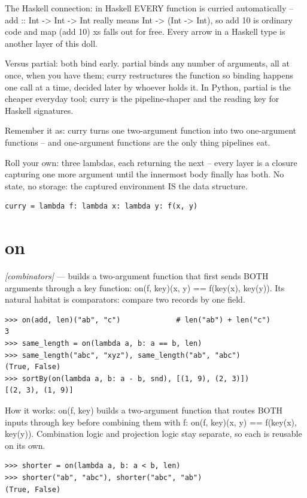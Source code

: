 \documentclass[11pt,letterpaper]{book}
\begin{document}
The Haskell connection: in Haskell EVERY function is curried automatically -- add :: Int -> Int -> Int really means Int -> (Int -> Int), so add 10 is ordinary code and map (add 10) xs falls out for free. Every arrow in a Haskell type is another layer of this doll.


Versus partial: both bind early. partial binds any number of arguments, all at once, when you have them; curry restructures the function so binding happens one call at a time, decided later by whoever holds it. In Python, partial is the cheaper everyday tool; curry is the pipeline-shaper and the reading key for Haskell signatures.


Remember it as: curry turns one two-argument function into two one-argument functions -- and one-argument functions are the only thing pipelines eat.


Roll your own: three lambdas, each returning the next -- every layer is a closure capturing one more argument until the innermost body finally has both. No state, no storage: the captured environment IS the data structure.

\begin{lstlisting}[style=code]
curry = lambda f: lambda x: lambda y: f(x, y)
\end{lstlisting}

\section{on}
\noindent\textit{[combinators]} --- builds a two-argument function that first sends BOTH arguments through a key function: on(f, key)(x, y) == f(key(x), key(y)). Its natural habitat is comparators: compare two records by one field.
\begin{lstlisting}[style=spec]
>>> on(add, len)("ab", "c")             # len("ab") + len("c")
3
>>> same_length = on(lambda a, b: a == b, len)
>>> same_length("abc", "xyz"), same_length("ab", "abc")
(True, False)
>>> sortBy(on(lambda a, b: a - b, snd), [(1, 9), (2, 3)])
[(2, 3), (1, 9)]
\end{lstlisting}

How it works: on(f, key) builds a two-argument function that routes BOTH inputs through key before combining them with f: on(f, key)(x, y) == f(key(x), key(y)). Combination logic and projection logic stay separate, so each is reusable on its own.

\begin{lstlisting}[style=spec]
>>> shorter = on(lambda a, b: a < b, len)
>>> shorter("ab", "abc"), shorter("abc", "ab")
(True, False)
\end{lstlisting}
\end{document}
